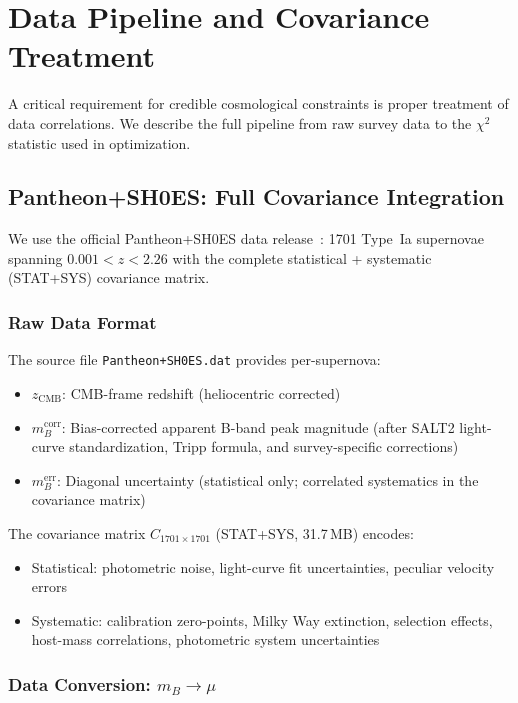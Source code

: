 \documentclass[twocolumn,showpacs,preprintnumbers,amsmath,amssymb,prl]{revtex4-2}
\begin{document}
\section{Data Pipeline and Covariance Treatment}
\label{sec:data_pipeline}

A critical requirement for credible cosmological constraints is proper treatment of data correlations. We describe the full pipeline from raw survey data to the $\chi^2$ statistic used in optimization.

\subsection{Pantheon+SH0ES: Full Covariance Integration}

We use the official Pantheon+SH0ES data release~\cite{Scolnic2022,Brout2022}: 1701 Type~Ia supernovae spanning $0.001 < z < 2.26$ with the complete statistical + systematic (STAT+SYS) covariance matrix.

\subsubsection{Raw Data Format}

The source file \texttt{Pantheon+SH0ES.dat} provides per-supernova:
\begin{itemize}
\item $z_\text{CMB}$: CMB-frame redshift (heliocentric corrected)
\item $m_B^\text{corr}$: Bias-corrected apparent B-band peak magnitude (after SALT2 light-curve standardization, Tripp formula, and survey-specific corrections)
\item $m_B^\text{err}$: Diagonal uncertainty (statistical only; correlated systematics in the covariance matrix)
\end{itemize}

The covariance matrix $C_{1701\times1701}$ (STAT+SYS, 31.7\,MB) encodes:
\begin{itemize}
\item Statistical: photometric noise, light-curve fit uncertainties, peculiar velocity errors
\item Systematic: calibration zero-points, Milky Way extinction, selection effects, host-mass correlations, photometric system uncertainties
\end{itemize}

\subsubsection{Data Conversion: $m_B \to \mu$}
\end{document}
